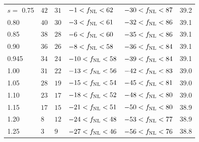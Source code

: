 \begin{table}
{\begin{tabular}{llllll}
\hline
$s=$ 0.75                                    & $    42$& $    31$& $    -1<f_{\rm NL}<    62$& $   -30<f_{\rm NL}<    87$ &   39.2\\
0.80                                    & $    40$& $    30$& $    -3<f_{\rm NL}<    61$& $   -32<f_{\rm NL}<    86$ &   39.1\\
0.85                                    & $    38$& $    28$& $    -6<f_{\rm NL}<    60$& $   -35<f_{\rm NL}<    86$ &   39.1\\
0.90                                    & $    36$& $    26$& $    -8<f_{\rm NL}<    58$& $   -36<f_{\rm NL}<    84$ &   39.1\\
0.945                                   & $    34$& $    24$& $   -10<f_{\rm NL}<    58$& $   -39<f_{\rm NL}<    84$ &   39.1\\
1.00                                    & $    31$& $    22$& $   -13<f_{\rm NL}<    56$& $   -42<f_{\rm NL}<    83$ &   39.0\\
1.05                                    & $    28$& $    19$& $   -15<f_{\rm NL}<    54$& $   -45<f_{\rm NL}<    81$ &   39.0\\
1.10                                    & $    23$& $    17$& $   -18<f_{\rm NL}<    52$& $   -48<f_{\rm NL}<    80$ &   39.0\\
1.15                                    & $    17$& $    15$& $   -21<f_{\rm NL}<    51$& $   -50<f_{\rm NL}<    80$ &   38.9\\
1.20                                    & $     8$& $    12$& $   -24<f_{\rm NL}<    48$& $   -53<f_{\rm NL}<    77$ &   38.9\\
1.25                                    & $     3$& $     9$& $   -27<f_{\rm NL}<    46$& $   -56<f_{\rm NL}<    76$ &   38.8\\
    \end{tabular}}
\end{table}


